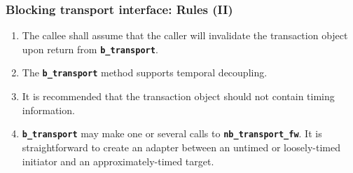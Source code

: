 {\begin{frame}
	\frametitle{Blocking transport interface: Rules (II)}
	\begin{enumerate}
	\item The callee shall assume that the caller will invalidate the transaction object upon return from \texttt{\textbf{b\_transport}}.
	\item The \texttt{\textbf{b\_transport}} method supports temporal decoupling.
	\item It is recommended that the transaction object should not contain timing information. 
	\item \texttt{\textbf{b\_transport}} may make one or several calls to \texttt{\textbf{nb\_transport\_fw}}. 
	It is straightforward to create an adapter between an untimed or loosely-timed initiator and an approximately-timed target.
	\end{enumerate}
\end{frame}
}

